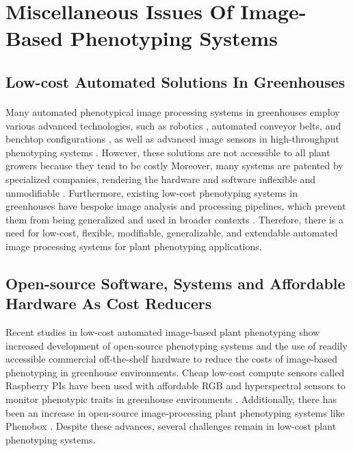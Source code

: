 \section{Miscellaneous Issues Of Image-Based Phenotyping Systems}
\subsection{Low-cost Automated Solutions In Greenhouses}
\paragraph{}
Many automated phenotypical image processing systems in greenhouses employ various advanced technologies, such as robotics \cite{saddikMappingAgriculturalSoil}, automated conveyor belts, and benchtop configurations \cite{bruningDevelopmentHyperspectralDistribution2019, peironeAssessingEfficiencyPhenotyping2018}, as well as advanced image sensors in high-throughput phenotyping systems \cite{liHighThroughputPlantPhenotyping2021}. However, these solutions are not accessible to all plant growers because they tend to be costly \cite{lienLowcostOpensourcePlatform2019, tovarRaspberryPiPowered2018a, minerviniImageAnalysisNew2015} Moreover, many systems are patented by specialized companies, rendering the hardware and software inflexible and unmodifiable \cite{czedik-eysenbergPhenoBoxFlexibleAutomated2018}. Furthermore, existing low-cost phenotyping systems in greenhouses have bespoke image analysis and processing pipelines, which prevent them from being generalized and used in broader contexts \cite{arnalbarbedoDigitalImageProcessing2013, liReviewImagingTechniques2014}. Therefore, there is a need for low-cost, flexible, modifiable, generalizable, and extendable automated image processing systems for plant phenotyping applications.

\subsection{Open-source Software, Systems and Affordable Hardware As Cost Reducers}
Recent studies in low-cost automated image-based plant phenotyping show increased development of open-source phenotyping systems and the use of readily accessible commercial off-the-shelf hardware \cite{liDigitizationVisualizationGreenhouse2015, minerviniImageAnalysisNew2015} to reduce the costs of image-based phenotyping in greenhouse environments. Cheap low-cost compute sensors called Raspberry PIs have been used with affordable RGB and hyperspectral sensors to monitor phenotypic traits in greenhouse environments \cite{tovarRaspberryPiPowered2018a}. Additionally, there has been an increase in open-source image-processing plant phenotyping systems like Phenobox \cite{czedik-eysenbergPhenoBoxFlexibleAutomated2018}. Despite these advances, several challenges remain in low-cost plant phenotyping systems.

